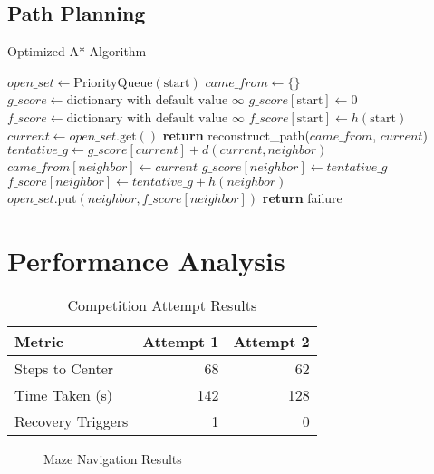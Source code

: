 \documentclass[12pt,a4paper]{article}
\begin{document}
\subsection{Path Planning}
\begin{algorithm}[H]
\caption{Optimized A* Algorithm}
\begin{algorithmic}[1]
\State $open\_set \gets \text{PriorityQueue}(\text{start})$
\State $came\_from \gets \{\}$
\State $g\_score \gets \text{dictionary with default value } \infty$
\State $g\_score[\text{start}] \gets 0$
\State $f\_score \gets \text{dictionary with default value } \infty$
\State $f\_score[\text{start}] \gets h(\text{start})$
    \State $current \gets open\_set.\text{get}()$
        \State \textbf{return} reconstruct\_path($came\_from$, $current$)
    \EndIf
        \State $tentative\_g \gets g\_score[current] + d(current, neighbor)$
            \State $came\_from[neighbor] \gets current$
            \State $g\_score[neighbor] \gets tentative\_g$
            \State $f\_score[neighbor] \gets tentative\_g + h(neighbor)$
                \State $open\_set.\text{put}(neighbor, f\_score[neighbor])$
            \EndIf
        \EndIf
    \EndFor
\EndWhile
\State \textbf{return} failure
\EndProcedure
\end{algorithmic}
\end{algorithm}

\section{Performance Analysis}
\begin{table}[h]
\centering
\begin{tabularx}{0.9\textwidth}{|X|r|r|}
\hline
\textbf{Metric} & \textbf{Attempt 1} & \textbf{Attempt 2} \\ \hline
Steps to Center & 68 & 62 \\ \hline
Time Taken (s) & 142 & 128 \\ \hline
Recovery Triggers & 1 & 0 \\ \hline
\end{tabularx}
\caption{Competition Attempt Results}
\end{table}

\begin{figure}[h]
    \centering
    \hfill
    \caption{Maze Navigation Results}
    \label{fig:attempts}
\end{figure}
\end{document}
